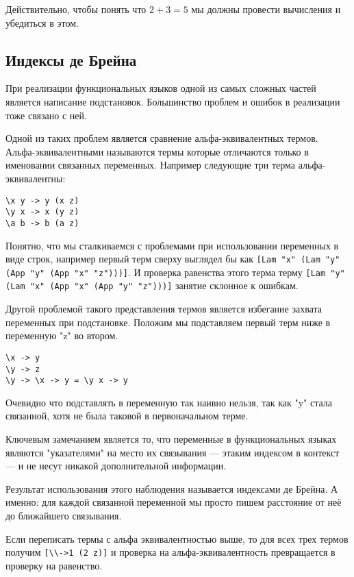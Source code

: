 Действительно, чтобы понять что $2 + 3 = 5$ мы должны провести вычисления и убедиться в этом.

\subsection{Индексы де Брейна}\label{de_brujin}
При реализации функциональных языков одной из самых сложных частей является написание подстановок. Большинство проблем и ошибок в реализации тоже связано с ней.

Одной из таких проблем является сравнение альфа-эквивалентных термов. Альфа-эквивалентными называются термы которые отличаются только в именовании связанных переменных. Например следующие три терма альфа-эквивалентны:

\begin{lstlisting}
\x y -> y (x z)
\y x -> x (y z)
\a b -> b (a z)
\end{lstlisting}

Понятно, что мы сталкиваемся с проблемами при использовании переменных в виде строк, например первый терм сверху выглядел бы как \lstinline{[Lam "x" (Lam "y" (App "y" (App "x" "z")))]}. И проверка равенства этого терма терму \lstinline{[Lam "y" (Lam "x" (App "x" (App "y" "z")))]} занятие склонное к ошибкам.

Другой проблемой такого представления термов является избегание захвата переменных при подстановке. Положим мы подставляем первый терм ниже в переменную "z" во втором.
\begin{lstlisting}
\x -> y
\y -> z
\y -> \x -> y = \y x -> y
\end{lstlisting}

Очевидно что подставлять в переменную так наивно нельзя, так как "y" стала связанной, хотя не была таковой в первоначальном терме.

Ключевым замечанием является то, что переменные в функциональных языках являются "указателями" на место их связывания --- этаким индексом в контекст --- и не несут никакой дополнительной информации.

Результат использования этого наблюдения называется индексами де Брейна. А именно: для каждой связанной переменной мы просто пишем расстояние от неё до ближайшего связывания.

Если переписать термы с альфа эквивалентностью выше, то для всех трех термов получим \lstinline{[\\->1 (2 z)]} и проверка на альфа-эквивалентность превращается в проверку на равенство.

